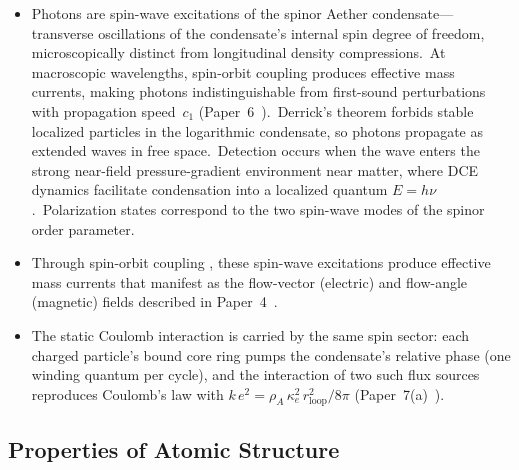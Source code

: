 ﻿\documentclass[12pt,letterpaper]{article}
\newcommand{\rhoa}{\rho_{\!A}}
\begin{document}
\begin{itemize}[leftmargin=2em]
  \item Photons are spin-wave excitations of the spinor Aether condensate---transverse
    oscillations of the condensate's internal spin degree of freedom, microscopically
    distinct from longitudinal density compressions.\ At macroscopic wavelengths,
    spin-orbit coupling produces effective mass currents, making photons
    indistinguishable from first-sound perturbations with propagation speed~$c_1$
    (Paper~6~\cite{otto-cosmology}).\ Derrick's theorem forbids stable localized
    particles in the logarithmic condensate, so photons propagate as extended waves
    in free space.\
    Detection occurs when the wave enters the strong near-field pressure-gradient
    environment near matter, where DCE dynamics facilitate condensation into a
    localized quantum $E = h\nu$.\
    Polarization states correspond to the two spin-wave modes of the spinor order
    parameter.
  \item Through spin-orbit coupling \cite{volovik2003}, these spin-wave excitations
    produce effective mass currents that manifest as the flow-vector (electric) and
    flow-angle (magnetic) fields described in Paper~4~\cite{otto-em}.
  \item The static Coulomb interaction is carried by the same spin sector: each
    charged particle's bound core ring pumps the condensate's relative phase (one
    winding quantum per cycle), and the interaction of two such flux sources
    reproduces Coulomb's law with
    $k\,e^2 = \rhoa\,\kappa_e^2\,r_{\mathrm{loop}}^2/8\pi$
    (Paper~7(a)~\cite{otto-boundcore}).
\end{itemize}


\subsection{Properties of Atomic Structure}
\end{document}
